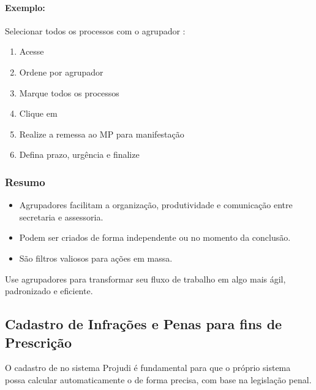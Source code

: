 \documentclass[letterpaper,10pt,brazil]{sphinxmanual}
\begin{document}
\paragraph{Exemplo:}
\label{\detokenize{projud_51_agrupador:exemplo}}
\sphinxAtStartPar
Selecionar todos os processos com o agrupador :
\begin{enumerate}
%
\item {} 
\sphinxAtStartPar
Acesse 

\item {} 
\sphinxAtStartPar
Ordene por agrupador

\item {} 
\sphinxAtStartPar
Marque todos os processos 

\item {} 
\sphinxAtStartPar
Clique em 

\item {} 
\sphinxAtStartPar
Realize a remessa ao MP para manifestação

\item {} 
\sphinxAtStartPar
Defina prazo, urgência e finalize

\end{enumerate}


\subsubsection{Resumo}
\label{\detokenize{projud_51_agrupador:resumo}}\begin{itemize}
\item {} 
\sphinxAtStartPar
Agrupadores facilitam a organização, produtividade e comunicação entre secretaria e assessoria.

\item {} 
\sphinxAtStartPar
Podem ser criados de forma independente ou no momento da conclusão.

\item {} 
\sphinxAtStartPar
São filtros valiosos para ações em massa.

\end{itemize}

\sphinxAtStartPar
Use agrupadores para transformar seu fluxo de trabalho em algo mais ágil, padronizado e eficiente.

\sphinxstepscope


\subsection{Cadastro de Infrações e Penas para fins de Prescrição}
\label{\detokenize{projud_52_cadastroinfracoes:cadastro-de-infracoes-e-penas-para-fins-de-prescricao}}\label{\detokenize{projud_52_cadastroinfracoes::doc}}
\sphinxAtStartPar
O cadastro de  no sistema Projudi é fundamental para que o próprio sistema possa calcular automaticamente o  de forma precisa, com base na legislação penal.
\end{document}
